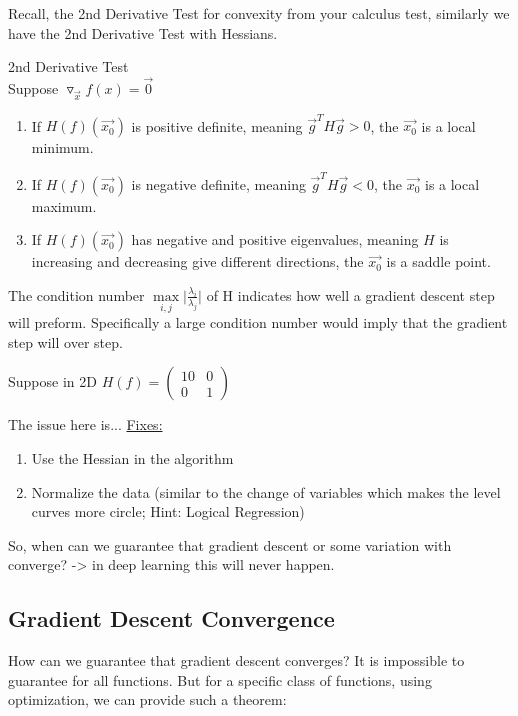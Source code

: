 Recall, the 2nd Derivative Test for convexity from your calculus test, similarly we have the 2nd Derivative Test with Hessians.
\begin{theorem}
2nd Derivative Test\\
Suppose $\triangledown_{\vec{x}} f(x)=\vec{0}$\\
\begin{enumerate}
    \item If $H(f)(\vec{x_0})$ is positive definite, meaning $\vec{g}^TH\vec{g}>0$, the $\vec{x_0}$ is a local minimum.
    \item If $H(f)(\vec{x_0})$ is negative definite, meaning $\vec{g}^TH\vec{g}<0$, the $\vec{x_0}$ is a local maximum.
    \item If $H(f)(\vec{x_0})$ has negative and positive eigenvalues, meaning $H$ is increasing and decreasing give different directions, the $\vec{x_0}$ is a saddle point.
\end{enumerate}
\end{theorem}
\begin{remark}
The condition number $\max\limits_{i,j} \lvert\frac{\lambda_i}{\lambda_j} \rvert$
of H indicates how well a gradient descent step will preform. Specifically a large condition number would imply that the gradient step will over step. 
\end{remark} 

\begin{example}
Suppose in 2D $H(f)=
\begin{pmatrix} 
10 & 0\\
0 & 1
\end{pmatrix}
$
\end{example}
The issue here is...
\underline{Fixes:}
\begin{enumerate}
    \item Use the Hessian in the algorithm
    \item Normalize the data (similar to the change of variables which makes the level curves more circle; Hint: Logical Regression)
\end{enumerate}
So, when can we guarantee that gradient descent or some variation with converge? -> in deep learning this will never happen.


\subsection{Gradient Descent Convergence}
\label{GD-convergence}

How can we guarantee that gradient descent converges? It is impossible to guarantee for all functions. But for a specific class of functions, using \cvx{} optimization, we can provide such a theorem:

